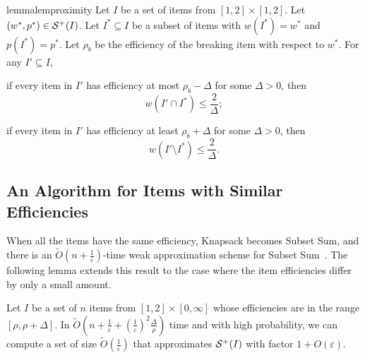 \documentclass[a4paper,UKenglish,cleveref, autoref, thm-restate, pdfa]{lipics-v2021}
\newcommand{\eps}{\varepsilon}
\renewcommand{\leq}{\leqslant}
\begin{document}
\begin{restatable}{lemma}{lemproximity}\label{lem:proximity}
    Let $I$ be a set of items from $[1,2]\times [1,2]$. Let $(w^*, p^*) \in {\cal S}^+(I)$.   Let $I^* \subseteq I$ be a subset of items with $w(I^*) = w^*$ and $p(I^*) = p^*$.  Let $\rho_b$ be the efficiency of the breaking item with respect to $w^*$.  For any $I' \subseteq I$, 
    \begin{romanenumerate}
        \item if every item in $I'$ has efficiency at most $\rho_b - \Delta$ for some $\Delta > 0$, then 
        \[
            w(I' \cap I^*) \leq \frac{2}{\Delta};
        \]

        \item if every item in $I'$ has efficiency at least $\rho_b + \Delta$ for some $\Delta > 0$, then 
        \[
            w(I' \setminus  I^*) \leq \frac{2}{\Delta}.
        \]
    \end{romanenumerate}
\end{restatable}

\subsection{An Algorithm for Items with Similar Efficiencies}
When all the items have the same efficiency, Knapsack becomes Subset Sum, and there is an $\tilde{O}(n + \frac{1}{\eps})$-time weak approximation scheme for Subset Sum~\cite{CLMZ24cSTOCPartition}. The following lemma extends this result to the case where the item efficiencies differ by only a small amount. 


\begin{lemma}\label{lem:alg-for-similar-eff}
    Let $I$ be a set of $n$ items from $[1,2]\times [0,\infty]$ whose efficiencies are in the range $[\rho, \rho + \Delta]$. In $\tilde{O}(n + \frac{1}{\eps} + (\frac{1}{\eps})^2 \frac{\Delta}{\rho})$ time and with high probability, we can compute a set of size $\tilde{O}(\frac{1}{\eps})$ that approximates ${\cal S}^+(I)$ with factor $1 + O(\eps)$.
\end{lemma}
\end{document}
